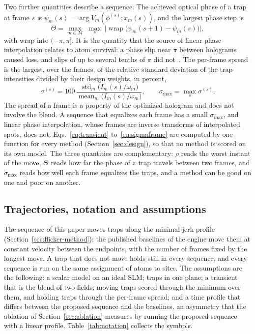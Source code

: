 Two further quantities describe a sequence. The achieved optical phase of a trap at frame $s$ is $\psi_m(s)=\arg V_m(\phi^{(s)};x_m(s))$, and the largest phase step is
\begin{equation}
\Theta=\max_{m\in\mathcal M}\ \max_{s}\ \big|\operatorname{wrap}\big(\psi_m(s+1)-\psi_m(s)\big)\big|,\label{eq:phasestep}
\end{equation}
with wrap into $(-\pi,\pi]$. It is the quantity that the source of linear phase interpolation relates to atom survival: a phase slip near $\pi$ between holograms caused loss, and slips of up to several tenths of $\pi$ did not~\cite{lpi}. The per-frame spread is the largest, over the frames, of the relative standard deviation of the trap intensities divided by their design weights, in percent,
\begin{equation}
\sigma^{(s)}=100\,\frac{\operatorname{std}_m\big(I_m(s)/\omega_m\big)}{\operatorname{mean}_m\big(I_m(s)/\omega_m\big)},\qquad \sigma_{\max}=\max_s\sigma^{(s)}.\label{eq:sigmaframe}
\end{equation}
The spread of a frame is a property of the optimized hologram and does not involve the blend. A sequence that equalizes each frame has a small $\sigma_{\max}$, and linear phase interpolation, whose frames are inverse transforms of interpolated spots, does not. Eqs.~\ref{eq:transient} to~\ref{eq:sigmaframe} are computed by one function for every method (Section~\ref{sec:design}), so that no method is scored on its own model. The three quantities are complementary: $\rho$ reads the worst instant of the move, $\Theta$ reads how far the phase of a trap travels between two frames, and $\sigma_{\max}$ reads how well each frame equalizes the traps, and a method can be good on one and poor on another.

\subsection{Trajectories, notation and assumptions}

The sequence of this paper moves traps along the minimal-jerk profile (Section~\ref{sec:flicker-method}); the published baselines of the engine move them at constant velocity between the endpoints, with the number of frames fixed by the longest move. A trap that does not move holds still in every sequence, and every sequence is run on the same assignment of atoms to sites. The assumptions are the following: a scalar model on an ideal SLM; traps in one plane; a transient that is the blend of two fields; moving traps scored through the minimum over them, and holding traps through the per-frame spread; and a time profile that differs between the proposed sequence and the baselines, an asymmetry that the ablation of Section~\ref{sec:ablation} measures by running the proposed sequence with a linear profile. Table~\ref{tab:notation} collects the symbols.

